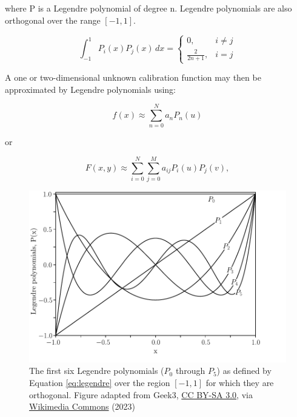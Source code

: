 \noindent where P is a Legendre polynomial of degree n. Legendre polynomials are also orthogonal over the range $[-1, 1]$.
\prgph

\begin{equation}
    \int_{-1}^{1} P_{i}(x) P_{j}(x) \,dx =
    \begin{cases}
        0,                 & i \neq j\\
        \frac{2}{2 n + 1}, & i = j
    \end{cases}
    \label{eq:legorth}
\end{equation}

A one or two-dimensional unknown calibration function may then be approximated by Legendre polynomials using:

\begin{equation}
    f(x) \approx \sum_{n = 0}^{N} a_{n} P_{n}(u)
    \label{eq:legendre}
\end{equation}

\noindent or

\begin{equation}
    F(x, y) \approx \sum_{i = 0}^{N} \sum_{j = 0}^{M} a_{ij} P_{i}(u) P_{j}(v),
    \label{eq:Legendre2D}
\end{equation}

\begin{figure}[t]
    \centering
    \includegraphics[width = 12cm]{figures/2_legendre.pdf}
    \caption{The first six Legendre polynomials ($P_0$ through $P_{5}$) as defined by Equation \ref{eq:legendre} over the region $[-1, 1]$ for which they are orthogonal. Figure adapted from Geek3, \protect\href{https://creativecommons.org/licenses/by-sa/3.0}{CC BY-SA 3.0}, via \protect\href{https://commons.wikimedia.org/wiki/File:Legendrepolynomials6.svg}{Wikimedia Commons} (2023)}
    \label{fig:legendre}
\end{figure}

